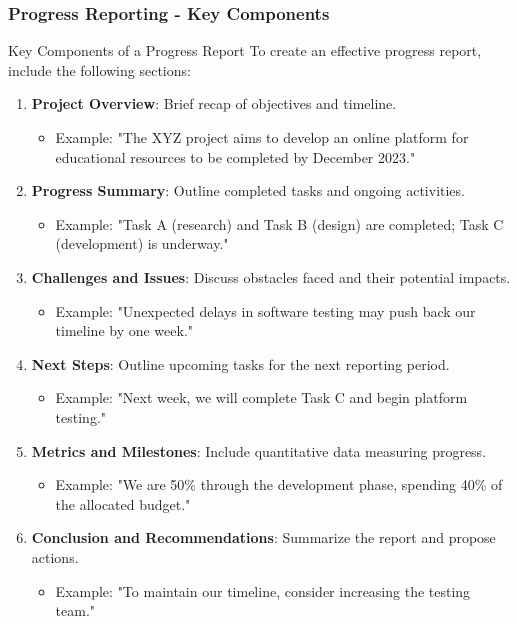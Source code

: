 \documentclass[aspectratio=169]{beamer}
\begin{document}
\begin{frame}[fragile]
  \frametitle{Progress Reporting - Key Components}
  \begin{block}{Key Components of a Progress Report}
    To create an effective progress report, include the following sections:
  \end{block}
  
  \begin{enumerate}
    \item \textbf{Project Overview}: Brief recap of objectives and timeline. 
      \begin{itemize}
        \item Example: "The XYZ project aims to develop an online platform for educational resources to be completed by December 2023."
      \end{itemize}
    \item \textbf{Progress Summary}: Outline completed tasks and ongoing activities. 
      \begin{itemize}
        \item Example: "Task A (research) and Task B (design) are completed; Task C (development) is underway."
      \end{itemize}
    \item \textbf{Challenges and Issues}: Discuss obstacles faced and their potential impacts. 
      \begin{itemize}
        \item Example: "Unexpected delays in software testing may push back our timeline by one week."
      \end{itemize}
    \item \textbf{Next Steps}: Outline upcoming tasks for the next reporting period.
      \begin{itemize}
        \item Example: "Next week, we will complete Task C and begin platform testing."
      \end{itemize}
    \item \textbf{Metrics and Milestones}: Include quantitative data measuring progress. 
      \begin{itemize}
        \item Example: "We are 50\% through the development phase, spending 40\% of the allocated budget."
      \end{itemize}
    \item \textbf{Conclusion and Recommendations}: Summarize the report and propose actions. 
      \begin{itemize}
        \item Example: "To maintain our timeline, consider increasing the testing team."
      \end{itemize}
  \end{enumerate}
\end{frame}
\end{document}
